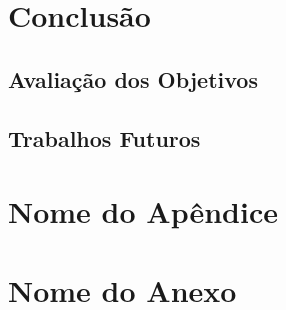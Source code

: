 \documentclass[openright]{normas-utf-tex} %
\begin{document}
\chapter{Conclusão}
\label{chpa:conc}
	
	\section{Avaliação dos Objetivos}

		

	\section{Trabalhos Futuros}

		



\clearpage %
\label{bibstart}
\label{bibend}

\apendice
\chapter{Nome do Ap\^endice}

\anexo
\chapter{Nome do Anexo}
\end{document}
